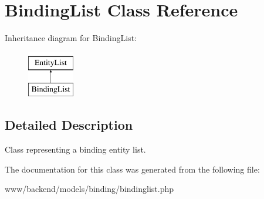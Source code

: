 \hypertarget{classBindingList}{
\section{BindingList Class Reference}
\label{classBindingList}
}
Inheritance diagram for BindingList:\begin{figure}[H]
\begin{center}
\leavevmode
\includegraphics[height=2.000000cm]{classBindingList}
\end{center}
\end{figure}


\subsection{Detailed Description}
Class representing a binding entity list. 

The documentation for this class was generated from the following file:\begin{DoxyCompactItemize}
\item 
www/backend/models/binding/bindinglist.php\end{DoxyCompactItemize}
